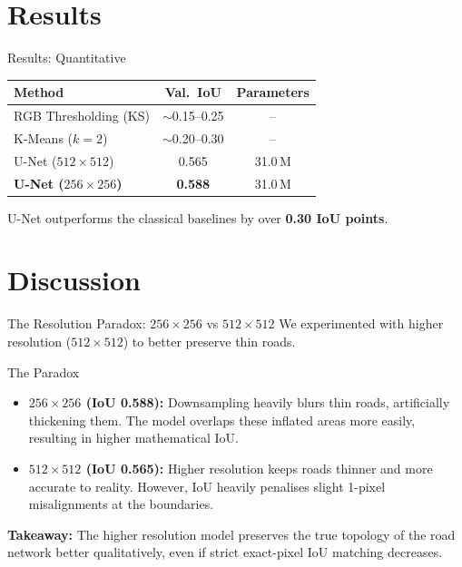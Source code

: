 \documentclass{beamer}
\begin{document}
\section{Results}

\begin{frame}{Results: Quantitative}
  \begin{center}
    \begin{tabular}{lcc}
      \toprule
      Method                  & Val.\ IoU        & Parameters \\
      \midrule
      RGB Thresholding (KS)   & $\sim$0.15--0.25 & -- \\
      K-Means ($k=2$)         & $\sim$0.20--0.30 & -- \\
      U-Net ($512\times512$)  & 0.565            & 31.0\,M \\
      \textbf{U-Net ($256\times256$)} & \textbf{0.588}   & 31.0\,M \\
      \bottomrule
    \end{tabular}
  \end{center}
  \vspace{0.5em}
  U-Net outperforms the classical baselines by over \textbf{0.30 IoU points}.
\end{frame}

\section{Discussion}

\begin{frame}{The Resolution Paradox: $256\times256$ vs $512\times512$}
  We experimented with higher resolution ($512\times512$) to better preserve thin roads.
  \vspace{0.5em}
  
  \begin{block}{The Paradox}
    \begin{itemize}
      \item \textbf{$256\times256$ (IoU 0.588):} Downsampling heavily blurs thin roads, artificially thickening them. The model overlaps these inflated areas more easily, resulting in higher mathematical IoU.
      \item \textbf{$512\times512$ (IoU 0.565):} Higher resolution keeps roads thinner and more accurate to reality. However, IoU heavily penalises slight 1-pixel misalignments at the boundaries.
    \end{itemize}
  \end{block}
  \vspace{0.5em}
  \textbf{Takeaway:} The higher resolution model preserves the true topology of the road network better qualitatively, even if strict exact-pixel IoU matching decreases.
\end{frame}
\end{document}
